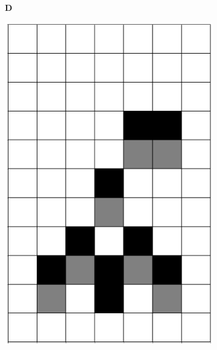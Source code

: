 \documentclass[12pt]{article}
\numberwithin{figure}{section} %
\begin{document}
\begin{figure}[H]
     	\begin{subfigure}[t]{0.03\textwidth}
    		\textbf{D}
  	\end{subfigure}		
         \begin{subfigure}{0.3\textwidth}
     		\centering
     		\includegraphics[angle=270,width=\linewidth]{Section4/6.0}
     		\subcaption{}
   	\end{subfigure}
     	\begin{subfigure}{0.3\textwidth}
     		\centering

\end{subfigure}
\end{figure}
\end{document}
